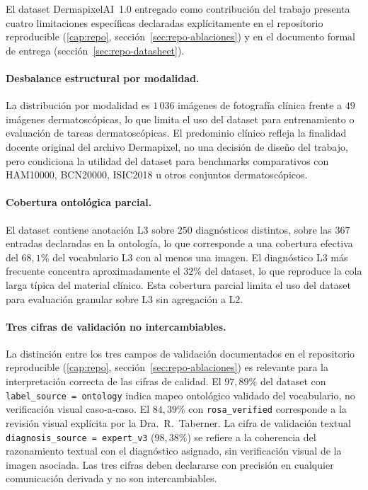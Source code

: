 El dataset DermapixelAI~1.0 entregado como contribución del trabajo
presenta cuatro limitaciones específicas declaradas explícitamente
en el repositorio reproducible (\ref{cap:repo}, sección~\ref{sec:repo-ablaciones}) y en el documento formal de entrega
(sección~\ref{sec:repo-datasheet}).

\paragraph{Desbalance estructural por modalidad.}
La distribución por modalidad es $1\,036$ imágenes de fotografía
clínica frente a $49$ imágenes dermatoscópicas, lo que limita
el uso del dataset para entrenamiento o evaluación de tareas
dermatoscópicas. El predominio clínico refleja la finalidad
docente original del archivo Dermapixel, no una decisión de
diseño del trabajo, pero condiciona la utilidad del dataset para
benchmarks comparativos con HAM10000, BCN20000, ISIC2018 u otros
conjuntos dermatoscópicos.

\paragraph{Cobertura ontológica parcial.}
El dataset contiene anotación L3 sobre $250$ diagnósticos
distintos, sobre las $367$ entradas declaradas en la
ontología, lo que corresponde a una cobertura efectiva del
$68{,}1\%$ del vocabulario L3 con al menos una imagen. El
diagnóstico L3 más frecuente concentra aproximadamente el
$32\%$ del dataset, lo que reproduce la cola larga típica del
material clínico. Esta cobertura parcial limita el uso del dataset
para evaluación granular sobre L3 sin agregación a L2.

\paragraph{Tres cifras de validación no intercambiables.}
La distinción entre los tres campos de validación documentados en
el repositorio reproducible (\ref{cap:repo}, sección~\ref{sec:repo-ablaciones}) es relevante para la interpretación
correcta de las cifras de calidad. El $97{,}89\%$ del dataset
con \texttt{label\_source = ontology} indica mapeo ontológico
validado del vocabulario, no verificación visual caso-a-caso. El
$84{,}39\%$ con \texttt{rosa\_verified} corresponde a la revisión
visual explícita por la Dra.~R.~Taberner. La cifra de validación
textual \texttt{diagnosis\_source = expert\_v3} ($98{,}38\%$) se
refiere a la coherencia del razonamiento textual con el
diagnóstico asignado, sin verificación visual de la imagen
asociada. Las tres cifras deben declararse con precisión en
cualquier comunicación derivada y no son intercambiables.

